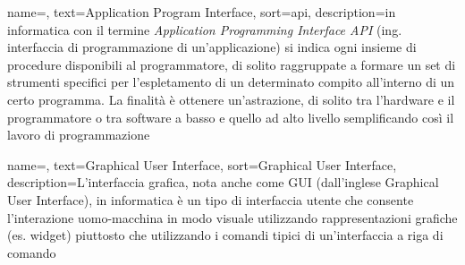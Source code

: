
\renewcommand{\acronymname}{Acronimi e abbreviazioni}

    


    
    
    
    


{
    name=,
    text=Application Program Interface,
    sort=api,
    description={in informatica con il termine \emph{Application Programming Interface API} (ing. interfaccia di programmazione di un'applicazione) si indica ogni insieme di procedure disponibili al programmatore, di solito raggruppate a formare un set di strumenti specifici per l'espletamento di un determinato compito all'interno di un certo programma. La finalità è ottenere un'astrazione, di solito tra l'hardware e il programmatore o tra software a basso e quello ad alto livello semplificando così il lavoro di programmazione}
}

{
    name=,
    text=Graphical User Interface,
    sort=Graphical User Interface,
    description={L'interfaccia grafica, nota anche come GUI (dall'inglese Graphical User Interface), in informatica è un tipo di interfaccia utente che consente l'interazione uomo-macchina in modo visuale utilizzando rappresentazioni grafiche (es. widget) piuttosto che utilizzando i comandi tipici di un'interfaccia a riga di comando}
}

